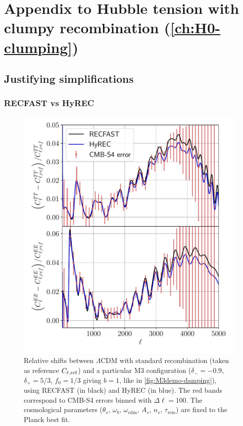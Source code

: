 \chapter{Appendix to Hubble tension with clumpy recombination\texorpdfstring{ (\cref{ch:H0-clumping})}{}}
\graphicspath{{H0-clumping/}}

\section{Justifying simplifications}

\subsection{RECFAST vs HyREC}
\label{sec:justify-reccodes}

\begin{figure}[htp]
\includegraphics[width=\columnwidth]{img/M3demo-reccodes.pdf}
\caption[Difference in CMB power spectrum multipoles computed with different recombination codes]{Relative shifts between $\Lambda$CDM with standard recombination (taken as reference $C_{\ell,\rm ref}$) and a particular M3 configuration ($\delta_-=-0.9$, $\delta_+=5/3$, $f_0=1/3$ giving $b=1$, like in \cref{fig:M3demo-damping}), using RECFAST (in black) and HyREC (in blue).
The red bands correspond to CMB-S4 errors binned with $\Delta\ell=100$.
The cosmological parameters ($\theta_s$, $\omega_b$, $\omega_\mathrm{cdm}$, $A_s$, $n_s$, $\tau_\mathrm{reio}$) are fixed to the Planck best fit. }
\label{fig:M3demo-reccodes}
\end{figure}

